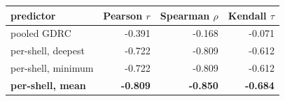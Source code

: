 \begin{tabular}{lrrr}
\toprule
predictor & Pearson $r$ & Spearman $\rho$ & Kendall $\tau$ \\
\midrule
pooled GDRC \citep{wilt2016} & -0.391 & -0.168 & -0.071 \\
per-shell, deepest & -0.722 & -0.809 & -0.612 \\
per-shell, minimum & -0.722 & -0.809 & -0.612 \\
\textbf{per-shell, mean} & \textbf{-0.809} & \textbf{-0.850} & \textbf{-0.684} \\
\bottomrule
\end{tabular}